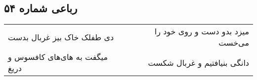\begin{center}
\section*{رباعی شماره ۵۴}
\label{sec:sh054}
\begin{longtable}{l p{0.5cm} r}
دی طفلک خاک بیز غربال بدست
&&
میزد بدو دست و روی خود را می‌خست
\\
میگفت به های‌های کافسوس و دریغ
&&
دانگی بنیافتیم و غربال شکست
\\
\end{longtable}
\end{center}
